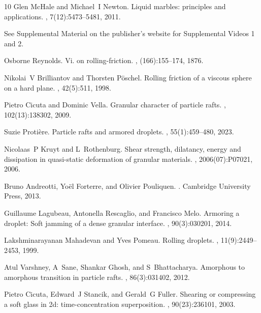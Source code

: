 \documentclass[twocolumn, prl,
 amsmath,amssymb,
 superscriptaddress,aps,
]{revtex4-2}
\begin{document}
\begin{thebibliography}{10}
	Glen McHale and Michael~I Newton.
	\newblock Liquid marbles: principles and applications.
	, 7(12):5473--5481, 2011.

	See Supplemental Material on the publisher's website for
	Supplemental Videos 1 and 2.

	Osborne Reynolds.
	\newblock Vi. on rolling-friction.
	,
	(166):155--174, 1876.

	Nikolai~V Brilliantov and Thorsten P{\"o}schel.
	\newblock Rolling friction of a viscous sphere on a hard plane.
	, 42(5):511, 1998.

	Pietro Cicuta and Dominic Vella.
	\newblock Granular character of particle rafts.
	, 102(13):138302, 2009.

	Suzie Proti{\`e}re.
	\newblock Particle rafts and armored droplets.
	, 55(1):459--480, 2023.

	Nicolaas~P Kruyt and L~Rothenburg.
	\newblock Shear strength, dilatancy, energy and dissipation in quasi-static
	deformation of granular materials.
	,
	2006(07):P07021, 2006.

	Bruno Andreotti, Yo{\"e}l Forterre, and Olivier Pouliquen.
	.
	\newblock Cambridge University Press, 2013.

	Guillaume Lagubeau, Antonella Rescaglio, and Francisco Melo.
	\newblock Armoring a droplet: Soft jamming of a dense granular interface.
	, 90(3):030201, 2014.

	Lakshminarayanan Mahadevan and Yves Pomeau.
	\newblock Rolling droplets.
	, 11(9):2449--2453, 1999.

	Atul Varshney, A~Sane, Shankar Ghosh, and S~Bhattacharya.
	\newblock Amorphous to amorphous transition in particle rafts.
	, 86(3):031402, 2012.

	Pietro Cicuta, Edward~J Stancik, and Gerald~G Fuller.
	\newblock Shearing or compressing a soft glass in 2d: time-concentration
	superposition.
	, 90(23):236101, 2003.


\end{thebibliography}
\end{document}

